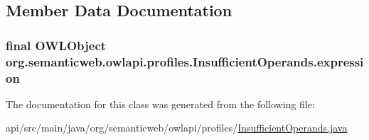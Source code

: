 \subsection{Member Data Documentation}
\hypertarget{classorg_1_1semanticweb_1_1owlapi_1_1profiles_1_1_insufficient_operands_ae583de76727c2d9ed614a3c259b88975}{
\subsubsection[{expression}]{\setlength{\rightskip}{0pt plus 5cm}final {\bf O\-W\-L\-Object} org.\-semanticweb.\-owlapi.\-profiles.\-Insufficient\-Operands.\-expression\hspace{0.3cm}{\ttfamily [private]}}}\label{classorg_1_1semanticweb_1_1owlapi_1_1profiles_1_1_insufficient_operands_ae583de76727c2d9ed614a3c259b88975}


The documentation for this class was generated from the following file\-:\begin{DoxyCompactItemize}
\item 
api/src/main/java/org/semanticweb/owlapi/profiles/\hyperlink{_insufficient_operands_8java}{Insufficient\-Operands.\-java}\end{DoxyCompactItemize}
